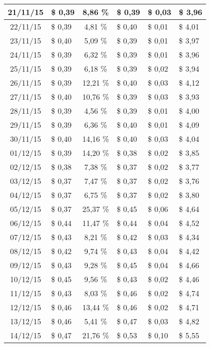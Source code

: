 \begin{center}
\begin{small}
\begin{longtable}{|c|l|c|l|l|l|}
21/11/15 & \$ 0,39 & 8,86 \% & \$ 0,39 & \$ 0,03 & \$ 3,96 \\ \hline
22/11/15 & \$ 0,39 & 4,81 \% & \$ 0,40 & \$ 0,01 & \$ 4,01 \\ \hline
23/11/15 & \$ 0,40 & 5,09 \% & \$ 0,39 & \$ 0,01 & \$ 3,97 \\ \hline
24/11/15 & \$ 0,39 & 6,32 \% & \$ 0,39 & \$ 0,01 & \$ 3,96 \\ \hline
25/11/15 & \$ 0,39 & 6,18 \% & \$ 0,39 & \$ 0,02 & \$ 3,94 \\ \hline
26/11/15 & \$ 0,39 & 12,21 \% & \$ 0,40 & \$ 0,03 & \$ 4,12 \\ \hline
27/11/15 & \$ 0,40 & 10,76 \% & \$ 0,39 & \$ 0,03 & \$ 3,93 \\ \hline
28/11/15 & \$ 0,39 & 4,56 \% & \$ 0,39 & \$ 0,01 & \$ 4,00 \\ \hline
29/11/15 & \$ 0,39 & 6,36 \% & \$ 0,40 & \$ 0,01 & \$ 4,09 \\ \hline
30/11/15 & \$ 0,40 & 14,16 \% & \$ 0,40 & \$ 0,03 & \$ 4,04 \\ \hline
01/12/15 & \$ 0,39 & 14,20 \% & \$ 0,38 & \$ 0,02 & \$ 3,85 \\ \hline
02/12/15 & \$ 0,38 & 7,38 \% & \$ 0,37 & \$ 0,02 & \$ 3,77 \\ \hline
03/12/15 & \$ 0,37 & 7,47 \% & \$ 0,37 & \$ 0,02 & \$ 3,76 \\ \hline
04/12/15 & \$ 0,37 & 6,75 \% & \$ 0,37 & \$ 0,02 & \$ 3,80 \\ \hline
05/12/15 & \$ 0,37 & 25,37 \% & \$ 0,45 & \$ 0,06 & \$ 4,64 \\ \hline
06/12/15 & \$ 0,44 & 11,47 \% & \$ 0,44 & \$ 0,04 & \$ 4,52 \\ \hline
07/12/15 & \$ 0,43 & 8,21 \% & \$ 0,42 & \$ 0,03 & \$ 4,34 \\ \hline
08/12/15 & \$ 0,42 & 9,74 \% & \$ 0,43 & \$ 0,04 & \$ 4,42 \\ \hline
09/12/15 & \$ 0,43 & 9,28 \% & \$ 0,45 & \$ 0,04 & \$ 4,66 \\ \hline
10/12/15 & \$ 0,45 & 9,56 \% & \$ 0,43 & \$ 0,02 & \$ 4,46 \\ \hline
11/12/15 & \$ 0,43 & 8,03 \% & \$ 0,46 & \$ 0,02 & \$ 4,74 \\ \hline
12/12/15 & \$ 0,46 & 13,44 \% & \$ 0,46 & \$ 0,02 & \$ 4,71 \\ \hline
13/12/15 & \$ 0,46 & 5,41 \% & \$ 0,47 & \$ 0,03 & \$ 4,82 \\ \hline
14/12/15 & \$ 0,47 & 21,76 \% & \$ 0,53 & \$ 0,10 & \$ 5,55 \\ \hline

\end{longtable}
\end{small}
\end{center}
